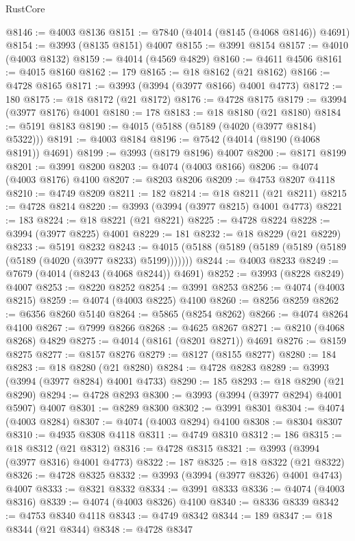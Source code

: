 \begin{lexlean}{RustCore}
\begin{coremodule}
@8146 := @4003 @8136
@8151 := @7840 (@4014 (@8145 (@4068 @8146)) @4691)
@8154 := @3993 (@8135 @8151) @4007
@8155 := @3991 @8154
@8157 := @4010 (@4003 @8132)
@8159 := @4014 (@4569 @4829)
@8160 := @4611 @4506
@8161 := @4015 @8160
@8162 := 179
@8165 := @18 @8162 (@21 @8162)
@8166 := @4728 @8165
@8171 := @3993 (@3994 (@3977 @8166) @4001 @4773)
@8172 := 180
@8175 := @18 @8172 (@21 @8172)
@8176 := @4728 @8175
@8179 := @3994 (@3977 @8176) @4001
@8180 := 178
@8183 := @18 @8180 (@21 @8180)
@8184 := @5191 @8183
@8190 := @4015 (@5188 (@5189 (@4020 (@3977 @8184) @5322)))
@8191 := @4003 @8184
@8196 := @7542 (@4014 (@8190 (@4068 @8191)) @4691)
@8199 := @3993 (@8179 @8196) @4007
@8200 := @8171 @8199
@8201 := @3991 @8200
@8203 := @4074 (@4003 @8166)
@8206 := @4074 (@4003 @8176) @4100
@8207 := @8203 @8206
@8209 := @4753 @8207 @4118
@8210 := @4749 @8209
@8211 := 182
@8214 := @18 @8211 (@21 @8211)
@8215 := @4728 @8214
@8220 := @3993 (@3994 (@3977 @8215) @4001 @4773)
@8221 := 183
@8224 := @18 @8221 (@21 @8221)
@8225 := @4728 @8224
@8228 := @3994 (@3977 @8225) @4001
@8229 := 181
@8232 := @18 @8229 (@21 @8229)
@8233 := @5191 @8232
@8243 := @4015 (@5188 (@5189 (@5189 (@5189 (@5189 (@5189 (@4020 (@3977 @8233) @5199)))))))
@8244 := @4003 @8233
@8249 := @7679 (@4014 (@8243 (@4068 @8244)) @4691)
@8252 := @3993 (@8228 @8249) @4007
@8253 := @8220 @8252
@8254 := @3991 @8253
@8256 := @4074 (@4003 @8215)
@8259 := @4074 (@4003 @8225) @4100
@8260 := @8256 @8259
@8262 := @6356 @8260 @5140
@8264 := @5865 (@8254 @8262)
@8266 := @4074 @8264 @4100
@8267 := @7999 @8266
@8268 := @4625 @8267
@8271 := @8210 (@4068 @8268) @4829
@8275 := @4014 (@8161 (@8201 @8271)) @4691
@8276 := @8159 @8275
@8277 := @8157 @8276
@8279 := @8127 (@8155 @8277)
@8280 := 184
@8283 := @18 @8280 (@21 @8280)
@8284 := @4728 @8283
@8289 := @3993 (@3994 (@3977 @8284) @4001 @4733)
@8290 := 185
@8293 := @18 @8290 (@21 @8290)
@8294 := @4728 @8293
@8300 := @3993 (@3994 (@3977 @8294) @4001 @5907) @4007
@8301 := @8289 @8300
@8302 := @3991 @8301
@8304 := @4074 (@4003 @8284)
@8307 := @4074 (@4003 @8294) @4100
@8308 := @8304 @8307
@8310 := @4935 @8308 @4118
@8311 := @4749 @8310
@8312 := 186
@8315 := @18 @8312 (@21 @8312)
@8316 := @4728 @8315
@8321 := @3993 (@3994 (@3977 @8316) @4001 @4773)
@8322 := 187
@8325 := @18 @8322 (@21 @8322)
@8326 := @4728 @8325
@8332 := @3993 (@3994 (@3977 @8326) @4001 @4743) @4007
@8333 := @8321 @8332
@8334 := @3991 @8333
@8336 := @4074 (@4003 @8316)
@8339 := @4074 (@4003 @8326) @4100
@8340 := @8336 @8339
@8342 := @4753 @8340 @4118
@8343 := @4749 @8342
@8344 := 189
@8347 := @18 @8344 (@21 @8344)
@8348 := @4728 @8347

\end{coremodule}
\end{lexlean}
